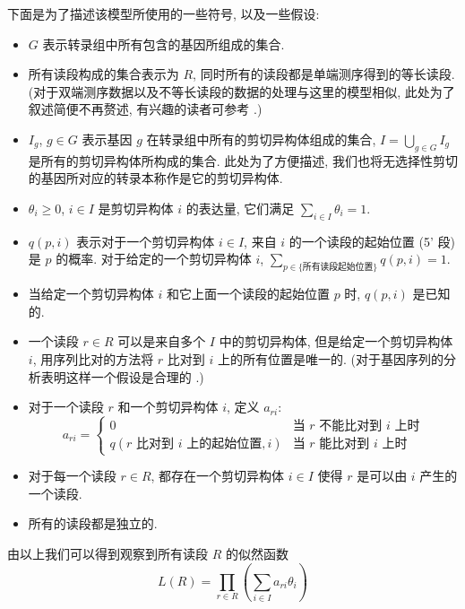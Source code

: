 下面是为了描述该模型所使用的一些符号, 以及一些假设: 
\begin{itemize}
\item $G$ 表示转录组中所有包含的基因所组成的集合. 

\item 所有读段构成的集合表示为 $R$, 同时所有的读段都是单端测序得到的等长读段. 
(对于双端测序数据以及不等长读段的数据的处理与这里的模型相似, 此处为了叙述简便不再赘述, 
有兴趣的读者可参考 .)

\item $I_g$, $g \in G$ 表示基因 $g$ 在转录组中所有的剪切异构体组成的集合, 
$I = \bigcup_{g \in G} I_g$ 是所有的剪切异构体所构成的集合. 
此处为了方便描述, 我们也将无选择性剪切的基因所对应的转录本称作是它的剪切异构体. 

\item $\theta_i \geq 0$, $i \in I$ 是剪切异构体 $i$ 的表达量, 
它们满足 $\sum_{i \in I} \theta_i = 1$. 

\item $q(p, i)$ 表示对于一个剪切异构体 $i \in I$, 
来自 $i$ 的一个读段的起始位置 (5' 段) 是 $p$ 的概率. 
对于给定的一个剪切异构体 $i$, 
$\sum_{p \in \{ \text{所有读段起始位置} \}} q(p, i) = 1$. 

\item 当给定一个剪切异构体 $i$ 和它上面一个读段的起始位置 $p$ 时, 
$q(p, i)$ 是已知的. 

\item 一个读段 $r \in R$ 可以是来自多个 $I$ 中的剪切异构体, 
但是给定一个剪切异构体 $i$, 
用序列比对的方法将 $r$ 比对到 $i$ 上的所有位置是唯一的. 
(对于基因序列的分析表明这样一个假设是合理的 \cite{peng2011t}.) 

\item 对于一个读段 $r$ 和一个剪切异构体 $i$, 定义 $a_{ri}$: 
\[
a_{ri} = \begin{cases}
0 & \text{当 $r$ 不能比对到 $i$ 上时} \\
q(\text{$r$ 比对到 $i$ 上的起始位置},i) & \text{当 $r$ 能比对到 $i$ 上时} \end{cases}
\]

\item 对于每一个读段 $r \in R$, 
都存在一个剪切异构体 $i \in I$ 使得 $r$ 是可以由 $i$ 产生的一个读段. 

\item 所有的读段都是独立的. 
\end{itemize}

由以上我们可以得到观察到所有读段 $R$ 的似然函数
\begin{equation}
L(R) = \prod_{r \in R} (\sum_{i \in I} a_{ri} \theta_i)
\end{equation}













